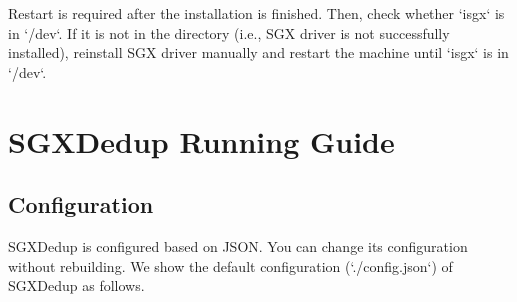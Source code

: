 Restart is required after the installation is finished. Then, check whether `isgx` is in `/dev`. If it is not in the directory (i.e., SGX driver is not successfully installed), reinstall SGX driver manually and restart the machine until `isgx` is in `/dev`.


\section{SGXDedup Running Guide}

\subsection{Configuration}

SGXDedup is configured based on JSON. You can change its configuration without rebuilding. We show the default configuration (`./config.json`) of SGXDedup as follows.

